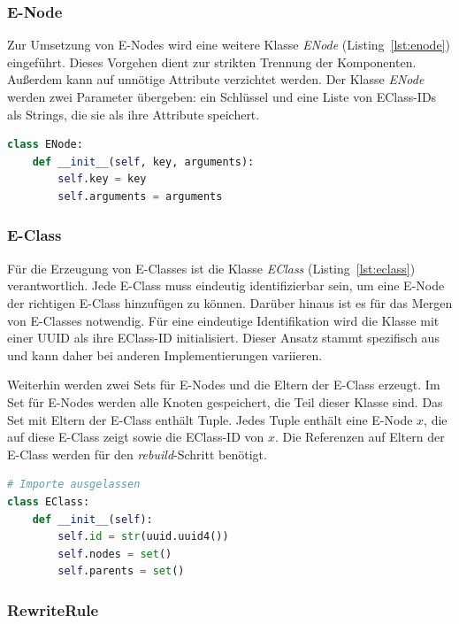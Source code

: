 \subsubsection{E-Node}

Zur Umsetzung von E-Nodes wird eine weitere Klasse \textit{ENode} (Listing~\ref{lst:enode}) eingeführt. Dieses Vorgehen dient zur strikten Trennung der Komponenten.
Außerdem kann auf unnötige Attribute verzichtet werden. 
Der Klasse \textit{ENode} werden zwei Parameter übergeben: ein Schlüssel und eine Liste von EClass-IDs als Strings, die sie als ihre Attribute speichert.

\begin{lstlisting}[language=Python, caption=Klasse \textit{ENode}, label={lst:enode}]
class ENode:
    def __init__(self, key, arguments):
        self.key = key
        self.arguments = arguments
\end{lstlisting}

\subsubsection{E-Class}

Für die Erzeugung von E-Classes ist die Klasse \textit{EClass} (Listing~\ref{lst:eclass}) verantwortlich. 
Jede E-Class muss eindeutig identifizierbar sein, um eine E-Node der richtigen E-Class hinzufügen zu können.
Darüber hinaus ist es für das Mergen von E-Classes notwendig.
Für eine eindeutige Identifikation wird die Klasse mit einer UUID als ihre EClass-ID initialisiert. Dieser Ansatz stammt spezifisch aus~\cite{2021-egg}
und kann daher bei anderen Implementierungen variieren.

Weiterhin werden zwei Sets für E-Nodes und die Eltern der E-Class erzeugt.
Im Set für E-Nodes werden alle Knoten gespeichert, die Teil dieser Klasse sind.
Das Set mit Eltern der E-Class enthält Tuple. 
Jedes Tuple enthält eine E-Node $x$, die auf diese E-Class zeigt sowie die EClass-ID von $x$.
Die Referenzen auf Eltern der E-Class werden für den \textit{rebuild}-Schritt benötigt.

\begin{lstlisting}[language=Python, caption=Klasse \textit{EClass}, label={lst:eclass}]
# Importe ausgelassen 
class EClass:
    def __init__(self):
        self.id = str(uuid.uuid4())
        self.nodes = set()
        self.parents = set()
\end{lstlisting}

\subsubsection{RewriteRule}

